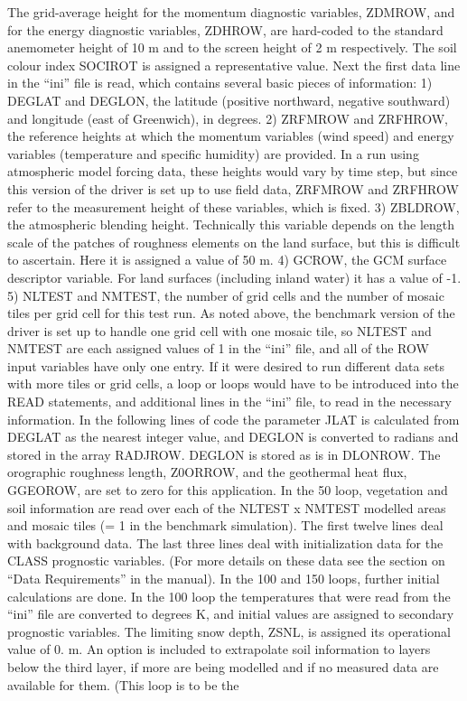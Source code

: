 The grid-\/average height for the momentum diagnostic variables, Z\+D\+M\+R\+O\+W, and for the energy diagnostic variables, Z\+D\+H\+R\+O\+W, are hard-\/coded to the standard anemometer height of 10 m and to the screen height of 2 m respectively. The soil colour index S\+O\+C\+I\+R\+O\+T is assigned a representative value. Next the first data line in the “ini” file is read, which contains several basic pieces of information\+: 1) D\+E\+G\+L\+A\+T and D\+E\+G\+L\+O\+N, the latitude (positive northward, negative southward) and longitude (east of Greenwich), in degrees. 2) Z\+R\+F\+M\+R\+O\+W and Z\+R\+F\+H\+R\+O\+W, the reference heights at which the momentum variables (wind speed) and energy variables (temperature and specific humidity) are provided. In a run using atmospheric model forcing data, these heights would vary by time step, but since this version of the driver is set up to use field data, Z\+R\+F\+M\+R\+O\+W and Z\+R\+F\+H\+R\+O\+W refer to the measurement height of these variables, which is fixed. 3) Z\+B\+L\+D\+R\+O\+W, the atmospheric blending height. Technically this variable depends on the length scale of the patches of roughness elements on the land surface, but this is difficult to ascertain. Here it is assigned a value of 50 m. 4) G\+C\+R\+O\+W, the G\+C\+M surface descriptor variable. For land surfaces (including inland water) it has a value of -\/1. 5) N\+L\+T\+E\+S\+T and N\+M\+T\+E\+S\+T, the number of grid cells and the number of mosaic tiles per grid cell for this test run. As noted above, the benchmark version of the driver is set up to handle one grid cell with one mosaic tile, so N\+L\+T\+E\+S\+T and N\+M\+T\+E\+S\+T are each assigned values of 1 in the “ini” file, and all of the R\+O\+W input variables have only one entry. If it were desired to run different data sets with more tiles or grid cells, a loop or loops would have to be introduced into the R\+E\+A\+D statements, and additional lines in the “ini” file, to read in the necessary information. In the following lines of code the parameter J\+L\+A\+T is calculated from D\+E\+G\+L\+A\+T as the nearest integer value, and D\+E\+G\+L\+O\+N is converted to radians and stored in the array R\+A\+D\+J\+R\+O\+W. D\+E\+G\+L\+O\+N is stored as is in D\+L\+O\+N\+R\+O\+W. The orographic roughness length, Z0\+O\+R\+R\+O\+W, and the geothermal heat flux, G\+G\+E\+O\+R\+O\+W, are set to zero for this application. In the 50 loop, vegetation and soil information are read over each of the N\+L\+T\+E\+S\+T x N\+M\+T\+E\+S\+T modelled areas and mosaic tiles (= 1 in the benchmark simulation). The first twelve lines deal with background data. The last three lines deal with initialization data for the C\+L\+A\+S\+S prognostic variables. (For more details on these data see the section on “\+Data Requirements” in the manual). In the 100 and 150 loops, further initial calculations are done. In the 100 loop the temperatures that were read from the “ini” file are converted to degrees K, and initial values are assigned to secondary prognostic variables. The limiting snow depth, Z\+S\+N\+L, is assigned its operational value of 0. m. An option is included to extrapolate soil information to layers below the third layer, if more are being modelled and if no measured data are available for them. (This loop is to be the 